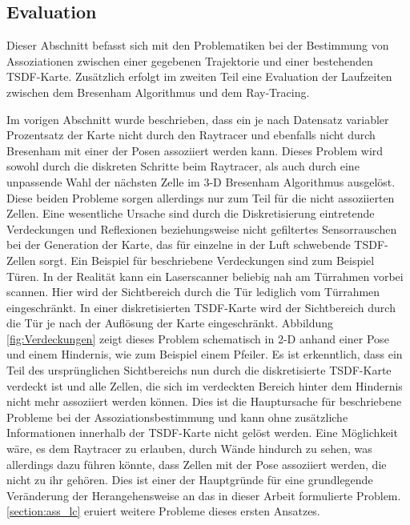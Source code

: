 \subsection{Evaluation}
\label{section:association_evaluation}

Dieser Abschnitt befasst sich mit den Problematiken bei der Bestimmung von Assoziationen zwischen einer gegebenen Trajektorie und einer bestehenden TSDF-Karte. Zusätzlich erfolgt im zweiten Teil eine Evaluation der Laufzeiten zwischen dem Bresenham Algorithmus und dem Ray-Tracing. 

Im vorigen Abschnitt wurde beschrieben, dass ein je nach Datensatz variabler Prozentsatz der Karte nicht durch den Raytracer und ebenfalls nicht durch Bresenham mit einer der Posen assoziiert werden kann. Dieses Problem wird sowohl durch die diskreten Schritte beim Raytracer, als auch durch eine unpassende Wahl der nächsten Zelle im 3-D Bresenham Algorithmus ausgelöst. Diese beiden Probleme sorgen allerdings nur zum Teil für die nicht assoziierten Zellen. Eine wesentliche Ursache sind durch die Diskretisierung eintretende Verdeckungen und Reflexionen beziehungsweise nicht gefiltertes Sensorrauschen bei der Generation der Karte, das für einzelne in der Luft schwebende TSDF-Zellen sorgt. Ein Beispiel für beschriebene Verdeckungen sind zum Beispiel Türen. In der Realität kann ein Laserscanner beliebig nah am Türrahmen vorbei scannen. Hier wird der Sichtbereich durch die Tür lediglich vom Türrahmen eingeschränkt. In einer diskretisierten TSDF-Karte wird der Sichtbereich durch die Tür je nach der Auflösung der Karte eingeschränkt. Abbildung \ref{fig:Verdeckungen} zeigt dieses Problem schematisch in 2-D anhand einer Pose und einem Hindernis, wie zum Beispiel einem Pfeiler. Es ist erkenntlich, dass ein Teil des ursprünglichen Sichtbereichs nun durch die diskretisierte TSDF-Karte verdeckt ist und alle Zellen, die sich im verdeckten Bereich hinter dem Hindernis nicht mehr assoziiert werden können. Dies ist die Hauptursache für beschriebene Probleme bei der Assoziationsbestimmung und kann ohne zusätzliche Informationen innerhalb der TSDF-Karte nicht gelöst werden. Eine Möglichkeit wäre, es dem Raytracer zu erlauben, durch Wände hindurch zu sehen, was allerdings dazu führen könnte, dass Zellen mit der Pose assoziiert werden, die nicht zu ihr gehören. Dies ist einer der Hauptgründe für eine grundlegende Veränderung der Herangehensweise an das in dieser Arbeit formulierte Problem. \ref{section:ass_lc} eruiert weitere Probleme dieses ersten Ansatzes.

